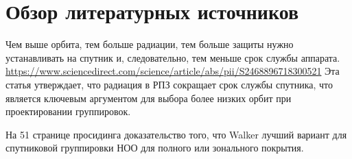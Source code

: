 \section{Обзор литературных источников}
\label{sec:literature-review}

Чем выше орбита, тем больше радиации, тем больше защиты нужно устанавливать на
спутник и, следовательно, тем меньше срок службы аппарата.
\url{https://www.sciencedirect.com/science/article/abs/pii/S2468896718300521}
Эта статья утверждает, что радиация в РПЗ сокращает срок службы спутника,
что является ключевым аргументом для выбора более низких орбит
при проектировании группировок.

На 51 странице просидинга \cite{van_der_Ha_1998} доказательство того, что Walker
лучший вариант для спутниковой группировки НОО для полного или зонального
покрытия.